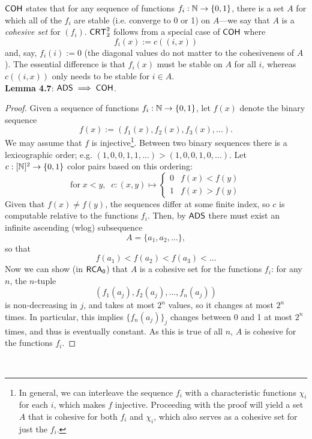 \documentclass{amsart}
\begin{document}
	$\operatorname{\sf{COH}}$ states that for any sequence of functions $f_i:\mathbb{N}\to \{0,1\}$, there is a set $A$ for which all of the $f_i$ are stable (i.e. converge to 0 or 1) on $A$---we say that $A$ is a \textit{cohesive set} for $(f_i)$. $\operatorname{\sf{CRT}}^2_2$ follows from a special case of $\operatorname{\sf{COH}}$ where
	$$f_i(x):= c((i,x))$$
	and, say, $f_i(i):=0$ (the diagonal values do not matter to the cohesiveness of $A$). The essential difference is that $f_i(x)$ must be stable on $A$ for all $i$, whereas $c((i,x))$ only needs to be stable for $i\in A$. \\
	
	\noindent \textbf{Lemma 4.7}: $\operatorname{\sf{ADS}} \implies \sf{COH}$. 
	\begin{proof}
		Given a sequence of functions $f_i:\mathbb{N}\to \{0,1\}$, let $f(x)$ denote the binary sequence
		$$
		f(x) := (f_1(x),f_2(x),f_3(x),\dots).
		$$
		We may assume that $f$ is injective\footnote{In general, we can interleave the sequence $f_i$ with a characteristic functions $\chi_i$ for each $i$, which makes $f$ injective. Proceeding with the proof will yield a set $A$ that is cohesive for both $f_i$ and $\chi_i$, which also serves as a cohesive set for just the $f_i$.}. Between two binary sequences there is a lexicographic order; e.g. $(1,0,0,1,1,\dots) > (1,0,0,1,0,\dots)$. Let $c:[\mathbb{N}]^2\to \{0,1\}$ color pairs based on this ordering:
		$$
		\text{for} \; x<y, \;\; c: (x,y)\mapsto \begin{cases}
			0 & f(x) < f(y) \\
			1 & f(x) > f(y)
		\end{cases}
		$$
		Given that $f(x)\neq f(y)$, the sequences differ at some finite index, so $c$ is computable relative to the functions $f_i$. Then, by $\operatorname{\sf{ADS}}$ there must exist an infinite ascending (wlog) subsequence
		$$A = \{a_1,a_2,\dots\},$$
		so that 
		$$
		f(a_1) < f(a_2) < f(a_3) < \dots
		$$
		Now we can show (in $\operatorname{\sf{RCA_0}}$) that $A$ is a cohesive set for the functions $f_i$: for any $n$, the $n$-tuple
		$$(f_1(a_j),f_2(a_j),\dots,f_n(a_j))$$
		is non-decreasing in $j$, and takes at most $2^n$ values, so it changes at most $2^n$ times. In particular, this implies $\{f_n(a_j)\}_j$ changes between 0 and 1 at most $2^n$ times, and thus is eventually constant. As this is true of all $n$, $A$ is cohesive for the functions $f_i$.
	\end{proof}\\
	
\end{document}
